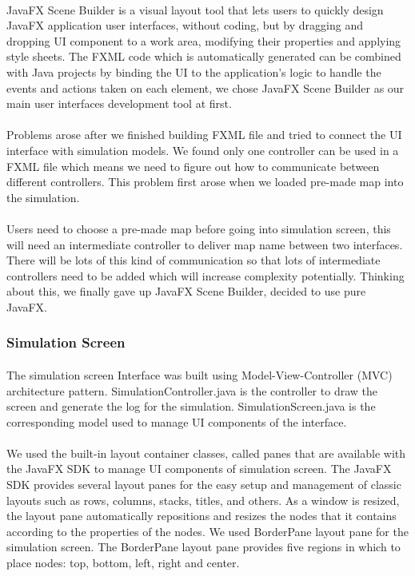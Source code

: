 \documentclass[a4paper,11pt,titlepage]{article}
\begin{document}
\paragraph{}
JavaFX Scene Builder is a visual layout tool that lets users to quickly design JavaFX application user interfaces, without coding, but by dragging and dropping UI component to a work area, modifying their properties and applying style sheets. The FXML code which is automatically generated can be combined with Java projects by binding the UI to the application's logic to handle the events and actions taken on each element, we chose JavaFX Scene Builder as our main user interfaces development tool at first.
\paragraph{}
Problems arose after we finished building FXML file and  tried to connect the UI interface with simulation models. We found only one controller can be used in a FXML file which means we need to figure out how to communicate between different controllers. This problem first arose when we loaded pre-made map into the simulation. 
\paragraph{}
Users need to choose a pre-made map before going into simulation screen, this will need an intermediate controller to deliver map name between two interfaces. There will be lots of this kind of communication so that lots of intermediate controllers need to be added which will increase complexity potentially. Thinking about this, we finally gave up JavaFX Scene Builder, decided to use pure JavaFX.

\subsubsection{Simulation Screen}
\paragraph{}
The simulation screen Interface was built using Model-View-Controller (MVC) architecture pattern. SimulationController.java is the controller to draw the screen and generate the log for the simulation. SimulationScreen.java is the corresponding model used to manage UI components of the interface. 
\paragraph{}
We used the built-in layout container classes, called panes that are available with the JavaFX SDK to manage UI components of simulation screen. The JavaFX SDK provides several layout panes for the easy setup and management of classic layouts such as rows, columns, stacks, titles, and others. As a window is resized, the layout pane automatically repositions and resizes the nodes that it contains according to the properties of the nodes. We used BorderPane layout pane for the simulation screen. The BorderPane layout pane provides five regions in which to place nodes: top, bottom, left, right and center. 
\end{document}
